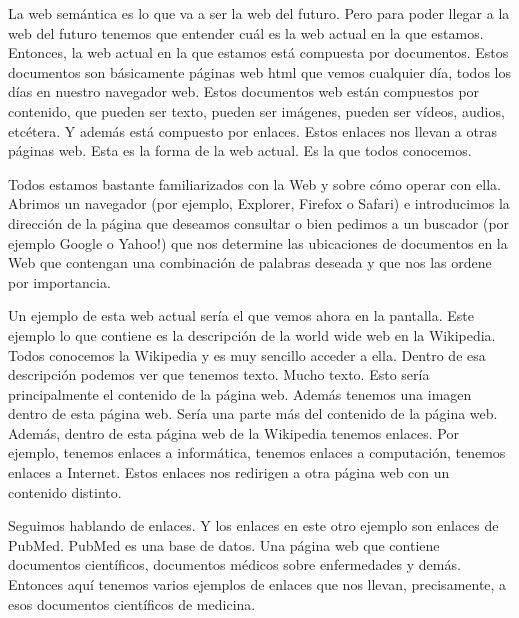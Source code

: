 La web semántica es lo que va a ser la web del futuro. Pero para poder llegar a la web del futuro tenemos que entender cuál es la web actual en la que estamos. Entonces, la web actual en la que estamos está compuesta por documentos. Estos documentos son básicamente páginas web html que vemos cualquier día, todos los días en nuestro navegador web. Estos documentos web están compuestos por contenido, que pueden ser texto, pueden ser imágenes, pueden ser vídeos, audios, etcétera. Y además está compuesto por enlaces. Estos enlaces nos llevan a otras páginas web. Esta es la forma de la web actual. Es la que todos conocemos.


Todos estamos bastante familiarizados con la Web y sobre cómo operar con ella. Abrimos un navegador (por ejemplo, Explorer, Firefox o Safari) e introducimos la dirección de la página que deseamos consultar o bien pedimos a un buscador (por ejemplo Google o Yahoo!) que nos determine las ubicaciones de documentos en la Web que contengan una combinación de palabras deseada y que nos las ordene por importancia.­ 


Un ejemplo de esta web actual sería el que vemos ahora en la pantalla. Este ejemplo lo que contiene es la descripción de la world wide web en la Wikipedia. Todos conocemos la Wikipedia y es muy sencillo acceder a ella. Dentro de esa descripción podemos ver que tenemos texto. Mucho texto. Esto sería principalmente el contenido de la página web. Además tenemos una imagen dentro de esta página web. Sería una parte más del contenido de la página web. Además, dentro de esta página web de la Wikipedia tenemos enlaces. Por ejemplo, tenemos enlaces a informática, tenemos enlaces a computación, tenemos enlaces a Internet. Estos enlaces nos redirigen a otra página web con un contenido distinto.




Seguimos hablando de enlaces. Y los enlaces en este otro ejemplo son enlaces de PubMed. PubMed es una base de datos. Una página web que contiene documentos científicos, documentos médicos sobre enfermedades y demás. Entonces aquí tenemos varios ejemplos de enlaces que nos llevan, precisamente, a esos documentos científicos de medicina.


